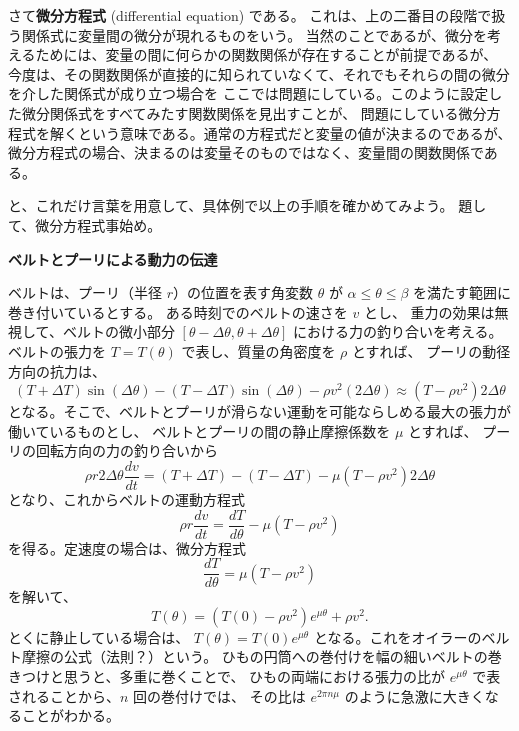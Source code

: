 \documentclass[a4paper]{jsarticle}
\theoremstyle{definition}
\theoremstyle{remark}
\begin{document}
さて\textbf{微分方程式} (differential equation) である。
これは、上の二番目の段階で扱う関係式に変量間の微分が現れるものをいう。
当然のことであるが、微分を考えるためには、変量の間に何らかの関数関係が存在することが前提であるが、
今度は、その関数関係が直接的に知られていなくて、それでもそれらの間の微分を介した関係式が成り立つ場合を
ここでは問題にしている。このように設定した微分関係式をすべてみたす関数関係を見出すことが、
問題にしている微分方程式を解くという意味である。通常の方程式だと変量の値が決まるのであるが、
微分方程式の場合、決まるのは変量そのものではなく、変量間の関数関係である。

と、これだけ言葉を用意して、具体例で以上の手順を確かめてみよう。
題して、微分方程式事始め。




\bigskip
\noindent
\textbf{ベルトとプーリによる動力の伝達}

ベルトは、プーリ（半径 $r$）の位置を表す角変数 $\theta$ が
$\alpha \leq \theta \leq \beta$ を満たす範囲に巻き付いているとする。
ある時刻でのベルトの速さを $v$ とし、
重力の効果は無視して、ベルトの微小部分 $[\theta - \Delta\theta,\theta + \Delta\theta]$ における力の釣り合いを考える。
ベルトの張力を $T = T(\theta)$ で表し、質量の角密度を $\rho$ とすれば、
プーリの動径方向の抗力は、
\[
  (T + \Delta T) \sin(\Delta\theta) - (T - \Delta T)\sin(\Delta \theta) - \rho v^2 (2\Delta\theta)
  \approx (T - \rho v^2) 2\Delta\theta
\]
となる。そこで、ベルトとプーリが滑らない運動を可能ならしめる最大の張力が働いているものとし、
ベルトとプーリの間の静止摩擦係数を $\mu$ とすれば、
プーリの回転方向の力の釣り合いから
\[
  \rho r 2\Delta\theta \frac{dv}{dt} = (T + \Delta T) - (T - \Delta T) - \mu(T - \rho v^2) 2\Delta\theta
\]
となり、これからベルトの運動方程式
\[
  \rho r \frac{dv}{dt} = \frac{dT}{d\theta} - \mu(T - \rho v^2)
\]
を得る。定速度の場合は、微分方程式
\[
  \frac{dT}{d\theta} = \mu(T - \rho v^2)
\]
を解いて、
\[
  T(\theta) = (T(0) - \rho v^2) e^{\mu\theta} + \rho v^2.
\]
とくに静止している場合は、
$T(\theta) = T(0) e^{\mu\theta}$ となる。これをオイラーのベルト摩擦の公式（法則？）という。
ひもの円筒への巻付けを幅の細いベルトの巻きつけと思うと、多重に巻くことで、
ひもの両端における張力の比が $e^{\mu \theta}$ で表されることから、$n$ 回の巻付けでは、
その比は $e^{2\pi n\mu}$ のように急激に大きくなることがわかる。
\end{document}
